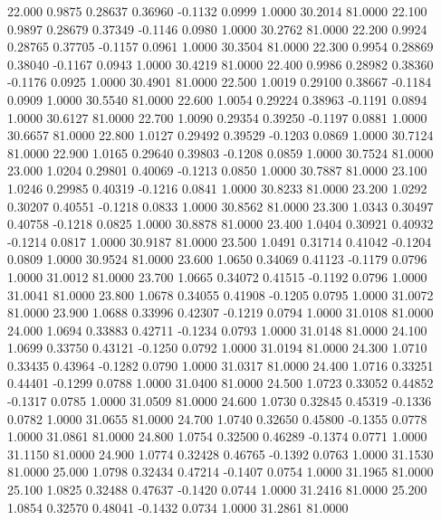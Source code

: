   22.000   0.9875   0.28637   0.36960  -0.1132   0.0999   1.0000  30.2014  81.0000
  22.100   0.9897   0.28679   0.37349  -0.1146   0.0980   1.0000  30.2762  81.0000
  22.200   0.9924   0.28765   0.37705  -0.1157   0.0961   1.0000  30.3504  81.0000
  22.300   0.9954   0.28869   0.38040  -0.1167   0.0943   1.0000  30.4219  81.0000
  22.400   0.9986   0.28982   0.38360  -0.1176   0.0925   1.0000  30.4901  81.0000
  22.500   1.0019   0.29100   0.38667  -0.1184   0.0909   1.0000  30.5540  81.0000
  22.600   1.0054   0.29224   0.38963  -0.1191   0.0894   1.0000  30.6127  81.0000
  22.700   1.0090   0.29354   0.39250  -0.1197   0.0881   1.0000  30.6657  81.0000
  22.800   1.0127   0.29492   0.39529  -0.1203   0.0869   1.0000  30.7124  81.0000
  22.900   1.0165   0.29640   0.39803  -0.1208   0.0859   1.0000  30.7524  81.0000
  23.000   1.0204   0.29801   0.40069  -0.1213   0.0850   1.0000  30.7887  81.0000
  23.100   1.0246   0.29985   0.40319  -0.1216   0.0841   1.0000  30.8233  81.0000
  23.200   1.0292   0.30207   0.40551  -0.1218   0.0833   1.0000  30.8562  81.0000
  23.300   1.0343   0.30497   0.40758  -0.1218   0.0825   1.0000  30.8878  81.0000
  23.400   1.0404   0.30921   0.40932  -0.1214   0.0817   1.0000  30.9187  81.0000
  23.500   1.0491   0.31714   0.41042  -0.1204   0.0809   1.0000  30.9524  81.0000
  23.600   1.0650   0.34069   0.41123  -0.1179   0.0796   1.0000  31.0012  81.0000
  23.700   1.0665   0.34072   0.41515  -0.1192   0.0796   1.0000  31.0041  81.0000
  23.800   1.0678   0.34055   0.41908  -0.1205   0.0795   1.0000  31.0072  81.0000
  23.900   1.0688   0.33996   0.42307  -0.1219   0.0794   1.0000  31.0108  81.0000
  24.000   1.0694   0.33883   0.42711  -0.1234   0.0793   1.0000  31.0148  81.0000
  24.100   1.0699   0.33750   0.43121  -0.1250   0.0792   1.0000  31.0194  81.0000
  24.300   1.0710   0.33435   0.43964  -0.1282   0.0790   1.0000  31.0317  81.0000
  24.400   1.0716   0.33251   0.44401  -0.1299   0.0788   1.0000  31.0400  81.0000
  24.500   1.0723   0.33052   0.44852  -0.1317   0.0785   1.0000  31.0509  81.0000
  24.600   1.0730   0.32845   0.45319  -0.1336   0.0782   1.0000  31.0655  81.0000
  24.700   1.0740   0.32650   0.45800  -0.1355   0.0778   1.0000  31.0861  81.0000
  24.800   1.0754   0.32500   0.46289  -0.1374   0.0771   1.0000  31.1150  81.0000
  24.900   1.0774   0.32428   0.46765  -0.1392   0.0763   1.0000  31.1530  81.0000
  25.000   1.0798   0.32434   0.47214  -0.1407   0.0754   1.0000  31.1965  81.0000
  25.100   1.0825   0.32488   0.47637  -0.1420   0.0744   1.0000  31.2416  81.0000
  25.200   1.0854   0.32570   0.48041  -0.1432   0.0734   1.0000  31.2861  81.0000
